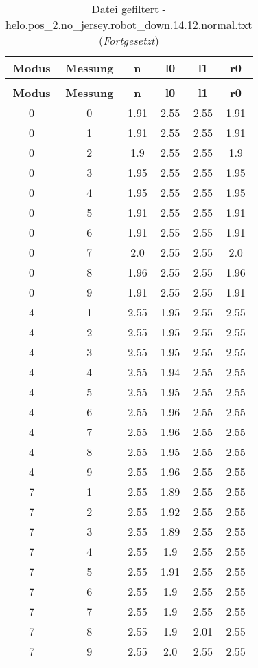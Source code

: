 \begin{longtable}{|c|c||c||c|c||c|}
	\caption{Datei gefiltert - helo.pos\_2.no\_jersey.robot\_down.14.12.normal.txt} \label{tab:helo.pos-2.no-jersey.robot-down.14.12.normal.txt} \\ \hline
	\textbf{Modus} & \textbf{Messung} & \textbf{n} & \textbf{l0} & \textbf{l1} & \textbf{r0}\\ \hline
	\endfirsthead
	\caption[]{Datei gefiltert - helo.pos\_2.no\_jersey.robot\_down.14.12.normal.txt (\emph{Fortgesetzt})} \\ \hline
	\textbf{Modus} & \textbf{Messung} & \textbf{n} & \textbf{l0} & \textbf{l1} & \textbf{r0}\\ \hline
	\endhead
	0 & 0 & 1.91 & 2.55 & 2.55 & 1.91 \\ \hline
	0 & 1 & 1.91 & 2.55 & 2.55 & 1.91 \\ \hline
	0 & 2 & 1.9 & 2.55 & 2.55 & 1.9 \\ \hline
	0 & 3 & 1.95 & 2.55 & 2.55 & 1.95 \\ \hline
	0 & 4 & 1.95 & 2.55 & 2.55 & 1.95 \\ \hline
	0 & 5 & 1.91 & 2.55 & 2.55 & 1.91 \\ \hline
	0 & 6 & 1.91 & 2.55 & 2.55 & 1.91 \\ \hline
	0 & 7 & 2.0 & 2.55 & 2.55 & 2.0 \\ \hline
	0 & 8 & 1.96 & 2.55 & 2.55 & 1.96 \\ \hline
	0 & 9 & 1.91 & 2.55 & 2.55 & 1.91 \\ \hline
	4 & 1 & 2.55 & 1.95 & 2.55 & 2.55 \\ \hline
	4 & 2 & 2.55 & 1.95 & 2.55 & 2.55 \\ \hline
	4 & 3 & 2.55 & 1.95 & 2.55 & 2.55 \\ \hline
	4 & 4 & 2.55 & 1.94 & 2.55 & 2.55 \\ \hline
	4 & 5 & 2.55 & 1.95 & 2.55 & 2.55 \\ \hline
	4 & 6 & 2.55 & 1.96 & 2.55 & 2.55 \\ \hline
	4 & 7 & 2.55 & 1.96 & 2.55 & 2.55 \\ \hline
	4 & 8 & 2.55 & 1.95 & 2.55 & 2.55 \\ \hline
	4 & 9 & 2.55 & 1.96 & 2.55 & 2.55 \\ \hline
	7 & 1 & 2.55 & 1.89 & 2.55 & 2.55 \\ \hline
	7 & 2 & 2.55 & 1.92 & 2.55 & 2.55 \\ \hline
	7 & 3 & 2.55 & 1.89 & 2.55 & 2.55 \\ \hline
	7 & 4 & 2.55 & 1.9 & 2.55 & 2.55 \\ \hline
	7 & 5 & 2.55 & 1.91 & 2.55 & 2.55 \\ \hline
	7 & 6 & 2.55 & 1.9 & 2.55 & 2.55 \\ \hline
	7 & 7 & 2.55 & 1.9 & 2.55 & 2.55 \\ \hline
	7 & 8 & 2.55 & 1.9 & 2.01 & 2.55 \\ \hline
	7 & 9 & 2.55 & 2.0 & 2.55 & 2.55 \\ \hline
\end{longtable}
